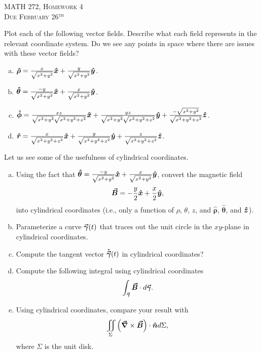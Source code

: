 \documentclass[12pt]{article} %
\newcommand{\grad}{\boldsymbol{\vec{\nabla}}}
\newcommand{\vecfieldB}{\boldsymbol{\vec{B}}}
\newcommand{\rhat}{\boldsymbol{\hat{r}}}
\newcommand{\thetahat}{\boldsymbol{\hat{\theta}}}
\newcommand{\phihat}{\boldsymbol{\hat{\phi}}}
\newcommand{\rhohat}{\boldsymbol{\hat{\rho}}}
\begin{document}
\begin{center}
   \textsc{\large MATH 272, Homework 4}\\
   \textsc{Due February 26$^\textrm{th}$}
\end{center}
\vspace{.5cm}

\begin{problem}
    Plot each of the following vector fields. Describe what each field represents in the relevant coordinate system. Do we see any points in space where there are issues with these vector fields?
    \begin{enumerate}[(a)]
        \item $\rhohat = \frac{x}{\sqrt{x^2+y^2}}\xhat + \frac{y}{\sqrt{x^2+y^2}}\yhat$.
        \item $\thetahat = \frac{-y}{\sqrt{x^2+y^2}}\xhat + \frac{x}{\sqrt{x^2+y^2}}\yhat$.
        \item $\phihat = \frac{xz}{\sqrt{x^2+y^2}\sqrt{x^2+y^2+z^2}}\xhat + \frac{yz}{\sqrt{x^2+y^2}\sqrt{x^2+y^2+z^2}}\yhat+\frac{-\sqrt{x^2+y^2}}{\sqrt{x^2+y^2+z^2}}\zhat$.
        \item $\rhat = \frac{x}{\sqrt{x^2+y^2+z^2}}\xhat + \frac{y}{\sqrt{x^2+y^2+z^2}}\yhat+\frac{z}{\sqrt{x^2+y^2+z^2}}\zhat$.
    \end{enumerate}
\end{problem}

\vspace*{.5cm}

\begin{problem}
Let us see some of the usefulness of cylindrical coordinates.
\begin{enumerate}[(a)]
    \item Using the fact that $\thetahat = \frac{-y}{\sqrt{x^2+y^2}}\xhat + \frac{x}{\sqrt{x^2+y^2}}\yhat$, convert the magnetic field 
    \[
    \vecfieldB = -\frac{y}{2}\xhat + \frac{x}{2}\yhat,
    \]
    into cylindrical coordinates (i.e., only a function of $\rho$, $\theta$, $z$, and $\rhohat$, $\thetahat$, and $\boldsymbol{\hat{z}}$).  
        \item Parameterize a curve $\boldsymbol{\vec{\gamma}}(t)$ that traces out the unit circle in the $xy$-plane in cylindrical coordinates.
        \item Compute the tangent vector $\boldsymbol{\dot{\vec{\gamma}}}(t)$ in cylindrical coordinates?
        \item Compute the following integral using cylindrical coordinates
        \[
        \int_{\curvegamma} \vecfieldB \cdot d\curvegamma.
        \]
        \item Using cylindrical coordinates, compare your result with
        \[
        \iint_\Sigma \left(\grad \times \vecfieldB\right) \cdot \unitvec d\Sigma,
        \]
        where $\Sigma$ is the unit disk.
\end{enumerate}
\end{problem}
\end{document}
